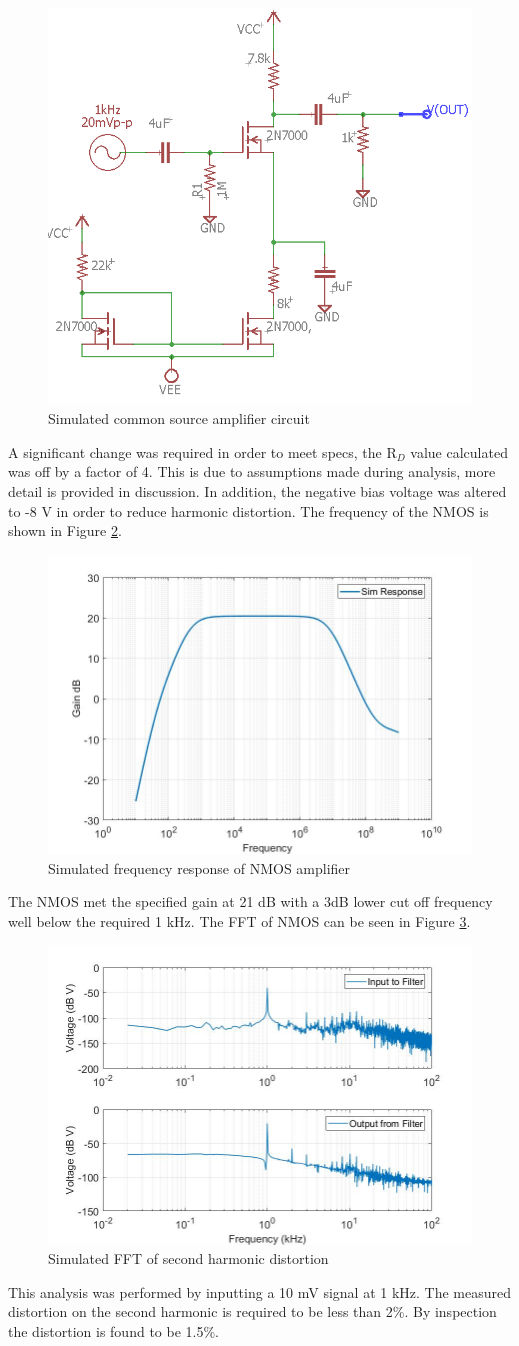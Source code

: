 	\begin{figure}[H]
		\centering
		\includegraphics[width=.55\textwidth]{CircuitDevelopment/NMOS_sim.png}
		\caption{Simulated common source amplifier circuit}
		\label{fig:NMOSsimcircuit}
	\end{figure}

	A significant change was required in order to meet specs, the R$_D$ value calculated was off by a factor of 4. This is due to assumptions made during analysis, more detail is provided in discussion. In addition, the negative bias voltage was altered to -8 V in order to reduce harmonic distortion. The frequency of the NMOS is shown in Figure \ref{fig:NMOSfreq}.
	
\begin{figure}[H]
		\centering
		\includegraphics[width=.55\textwidth]{CircuitDevelopment/NMOS_bandwidth.jpg}
		\caption{Simulated frequency response of NMOS amplifier}
		\label{fig:NMOSfreq}
\end{figure}

	The NMOS met the specified gain at 21 dB with a 3dB lower cut off frequency well below the required 1 kHz. The FFT of NMOS can be seen in Figure \ref{fig:nmosfft}.

\begin{figure}[H]
	\centering
	\includegraphics[width=.55\textwidth]{CircuitDevelopment/nmos_FFT.jpg}
	\caption{Simulated FFT of second harmonic distortion}
	\label{fig:nmosfft}
\end{figure}

	This analysis was performed by inputting a 10 mV signal at 1 kHz. The measured distortion on the second harmonic is required to be less than 2\%. By inspection the distortion is found to be 1.5\%.
	
	
	
	
	
